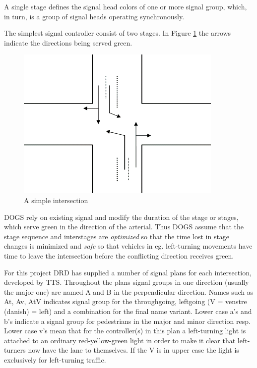 A single stage defines the signal head colors of one or more signal group, which, in turn, is a group of signal heads operating synchronously.

The simplest signal controller consist of two stages. In  Figure \ref{fig:simple_intersection} the arrows indicate the directions being served green.

\begin{figure}[!ht]
\begin{center}
\includegraphics[scale=0.5]{simple_intersection.png} 
\end{center}
\caption{A simple intersection}
\label{fig:simple_intersection}
\end{figure}

DOGS rely on existing signal and modify the duration of the stage or stages, which serve green in the direction of the arterial. Thus DOGS assume that the stage sequence and interstages are \textit{optimized} so that the time lost in stage changes is minimized and \textit{safe} so that vehicles in eg. left-turning movements have time to leave the intersection before the conflicting direction receives green.

For this project DRD has supplied a number of signal plans for each intersection, developed by TTS. Throughout the plans signal groups in one direction (usually the major one) are named A and B in the perpendicular direction. Names such as At, Av, AtV indicates signal group for the throughgoing, leftgoing (V = venstre (danish) = left) and a combination for the final name variant. Lower case a's and b's indicate a signal group for pedestrians in the major and minor direction resp. Lower case v's mean that for the controller(s) in this plan a left-turning light is attached to an ordinary red-yellow-green light in order to make it clear that left-turners now have the lane to themselves. If the V is in upper case the light is exclusively for left-turning traffic.

